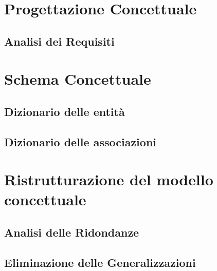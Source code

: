 \documentclass{article}
\begin{document}


\newpage

\tableofcontents

\newpage

\pagestyle{fancy}
\fancyhead[L]{ }

\section{Progettazione Concettuale}

\subsection{Analisi dei Requisiti}


\newpage
\section{Schema Concettuale}


\newpage
\subsection{Dizionario delle entità}


\subsection{Dizionario delle associazioni}


\newpage
\section{Ristrutturazione del modello concettuale}

\subsection{Analisi delle Ridondanze}


\subsection{Eliminazione delle Generalizzazioni}

\end{document}
